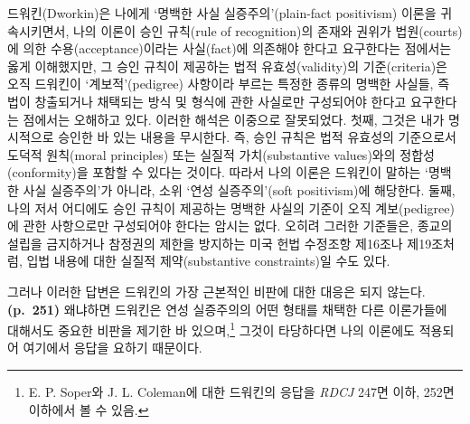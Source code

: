 드워킨(Dworkin)은 나에게 `명백한 사실 실증주의'(plain-fact positivism)
이론을 귀속시키면서, 나의 이론이 승인 규칙(rule of recognition)의 존재와
권위가 법원(courts)에 의한 수용(acceptance)이라는 사실(fact)에 의존해야
한다고 요구한다는 점에서는 옳게 이해했지만, 그 승인 규칙이 제공하는 법적
유효성(validity)의 기준(criteria)은 오직 드워킨이 `계보적'(pedigree)
사항이라 부르는 특정한 종류의 명백한 사실들, 즉 법이 창출되거나 채택되는
방식 및 형식에 관한 사실로만 구성되어야 한다고 요구한다는 점에서는
오해하고 있다. 이러한 해석은 이중으로 잘못되었다. 첫째, 그것은 내가
명시적으로 승인한 바 있는 내용을 무시한다. 즉, 승인 규칙은 법적 유효성의
기준으로서 도덕적 원칙(moral principles) 또는 실질적 가치(substantive
values)와의 정합성(conformity)을 포함할 수 있다는 것이다. 따라서 나의
이론은 드워킨이 말하는 `명백한 사실 실증주의'가 아니라, 소위 `연성
실증주의'(soft positivism)에 해당한다. 둘째, 나의 저서 어디에도 승인
규칙이 제공하는 명백한 사실의 기준이 오직 계보(pedigree)에 관한
사항으로만 구성되어야 한다는 암시는 없다. 오히려 그러한 기준들은, 종교의
설립을 금지하거나 참정권의 제한을 방지하는 미국 헌법 수정조항 제16조나
제19조처럼, 입법 내용에 대한 실질적 제약(substantive constraints)일 수도
있다.

그러나 이러한 답변은 드워킨의 가장 근본적인 비판에 대한 대응은 되지
않는다. \textbf{(p.~251)} 왜냐하면 드워킨은 연성 실증주의의 어떤 형태를
채택한 다른 이론가들에 대해서도 중요한 비판을 제기한 바
있으며,\footnote{E. P. Soper와 J. L. Coleman에 대한 드워킨의 응답을
  \emph{RDCJ} 247면 이하, 252면 이하에서 볼 수 있음.} 그것이 타당하다면
나의 이론에도 적용되어 여기에서 응답을 요하기 때문이다.

